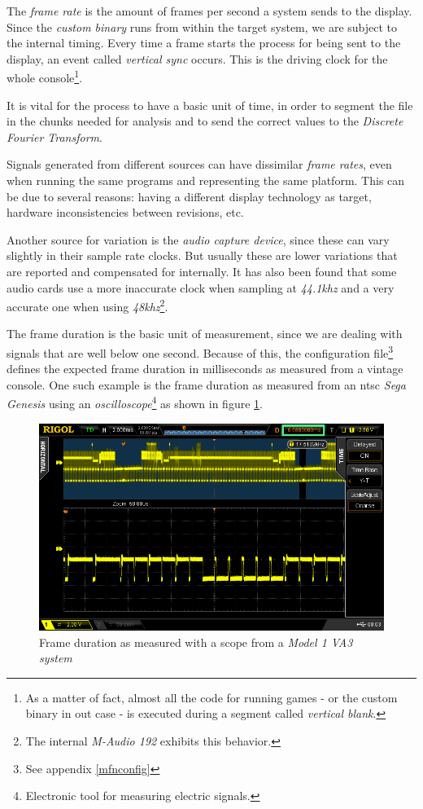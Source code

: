 \documentclass[10pt,a4paper]{report}
\newcommand{\fkhz}[1]{\textit{#1\acrshort{khz}}}
\begin{document}
\begin{appendices}
The \textit{frame rate} is the amount of frames per second a system sends to the display. Since the \textit{custom binary} runs from within the target system, we are subject to the internal timing. Every time a frame starts the process for being sent to the display, an event called \textit{vertical sync} occurs. This is the driving clock for the whole console\footnote{As a matter of fact, almost all the code for running games - or the custom binary in out case - is executed during a segment called \textit{vertical blank}.}.

It is vital for the process to have a basic unit of time, in order to segment the file in the chunks needed for analysis and to send the correct values to the \textit{Discrete Fourier Transform}.

Signals generated from different sources can have dissimilar \textit{frame rates}, even when running the same programs and representing the same platform. This can be due to several reasons: having a different display technology as target, hardware inconsistencies between revisions, etc.

Another source for variation is the \textit{audio capture device}, since these can vary slightly in their sample rate clocks. But usually these are lower variations that are reported and compensated for internally. It has also been found that some audio cards use a more inaccurate clock when sampling at \fkhz{44.1} and a very accurate one when using \fkhz{48}\footnote{The internal \textit{M-Audio 192} exhibits this behavior.}.

The frame duration is the basic unit of measurement, since we are dealing with signals that are well below one second. Because of this, the configuration file\footnote{See appendix \ref{mfnconfig}} defines the expected frame duration in milliseconds as measured from a vintage console. One such example is the frame duration as measured from an \acrshort{ntsc} \textit{Sega Genesis} using an \textit{oscilloscope}\footnote{Electronic tool for measuring electric signals.} as shown in figure \ref{fig:frameratescope}.

\begin{figure}[H]
	\centering
	\includegraphics[width=1.0\linewidth]{images/scope/framerate-scope.png}
	\caption[Scope frame rate]{Frame duration as measured with a scope from a \textit{Model 1 VA3 system}}
	\label{fig:frameratescope}
\end{figure}


\end{appendices}
\end{document}
